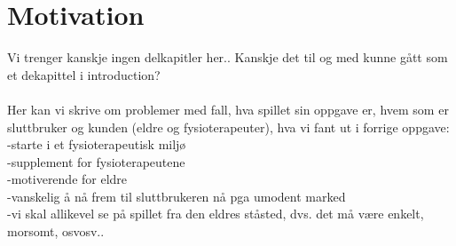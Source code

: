 \chapter{Motivation}
Vi trenger kanskje ingen delkapitler her.. Kanskje det til og med kunne gått som et dekapittel i introduction?\\ \\
Her kan vi skrive om problemer med fall, hva spillet sin oppgave er, hvem som er sluttbruker og kunden (eldre og fysioterapeuter), hva vi fant ut i forrige oppgave: \\
-starte i et fysioterapeutisk miljø \\
-supplement for fysioterapeutene \\
-motiverende for eldre \\ 
-vanskelig å nå frem til sluttbrukeren nå pga umodent marked\\
-vi skal allikevel se på spillet fra den eldres ståsted, dvs. det må være enkelt, morsomt, osvosv..
